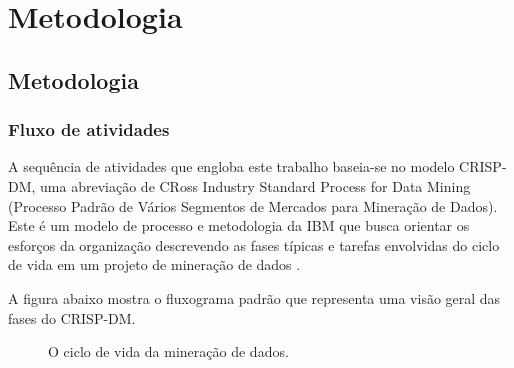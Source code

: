 \part{Metodologia}

\chapter{Metodologia}

\section{Fluxo de atividades}

A sequência de atividades que engloba este trabalho baseia-se no modelo CRISP-DM, uma abreviação de CRoss Industry Standard Process for Data Mining (Processo Padrão de Vários Segmentos de Mercados para Mineração de Dados). Este é um modelo de processo e metodologia da IBM que busca orientar os esforços da organização descrevendo as fases típicas e tarefas envolvidas do ciclo de vida em um projeto de mineração de dados \cite{crispdm}. 

A figura abaixo mostra o fluxograma padrão que representa uma visão geral das fases do CRISP-DM.

\begin{figure}[!htb]
    \caption{\label{fig:jupyter} O ciclo de vida da mineração de dados.}
\end{figure}

